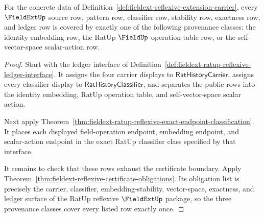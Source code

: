 \begin{theorem}
\label{thm:fieldext-ratup-reflexive-ledger-coverage}
For the concrete data of
Definition~\ref{def:fieldext-reflexive-extension-carrier}, every
$\FieldExtUp$ source row, pattern row, classifier row, stability row,
exactness row, and ledger row is covered by exactly one of the following
provenance classes: the identity embedding row, the RatUp $\FieldUp$
operation-table row, or the self-vector-space scalar-action row.
\end{theorem}
\begin{proof}
Start with the ledger interface of
Definition~\ref{def:fieldext-ratup-reflexive-ledger-interface}. It assigns
the four carrier displays to $\mathsf{RatHistoryCarrier}$, assigns every
classifier display to $\mathsf{RatHistoryClassifier}$, and separates the
public rows into the identity embedding, RatUp operation table, and
self-vector-space scalar action.

Next apply
Theorem~\ref{thm:fieldext-ratup-reflexive-exact-endpoint-classification}. It
places each displayed field-operation endpoint, embedding endpoint, and
scalar-action endpoint in the exact RatUp classifier class specified by that
interface.

It remains to check that these rows exhaust the certificate boundary. Apply
Theorem~\ref{thm:fieldext-reflexive-certificate-obligations}. Its obligation
list is precisely the carrier, classifier, embedding-stability,
vector-space, exactness, and ledger surface of the RatUp reflexive
$\FieldExtUp$ package, so the three provenance classes cover every listed
row exactly once.
\end{proof}

